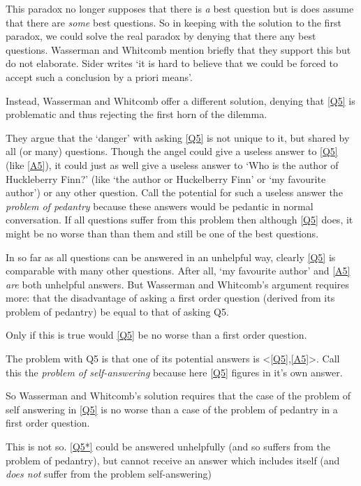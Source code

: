 This paradox no longer supposes that there is \emph{a} best question but is does assume that there are \emph{some} best questions.
So in keeping with the solution to the first paradox, we could solve the real paradox by denying that there any best questions.
Wasserman and Whitcomb mention briefly that they support this but do not elaborate. 
\autocite[151]{Wasserman_2011}
Sider writes `it is hard to believe that we could be forced to accept such a conclusion by a priori means'.
\autocite[4]{Sider1997}

Instead, Wasserman and Whitcomb offer a different solution, denying that \ref{Q5} is problematic and thus rejecting the first horn of the dilemma.

They argue that the `danger' with asking \ref{Q5} is not unique to it, but shared by all (or many) questions. 
Though the angel could give a useless answer to \ref{Q5} (like \ref{A5}), it could just as well give a useless answer to `Who is the author of Huckleberry Finn?' (like `the author or Huckelberry Finn' or `my favourite author') or any other question.
Call the potential for such a useless answer the \textit{problem of pedantry} because these answers would be pedantic in normal conversation.
If all questions suffer from this problem then although \ref{Q5} does, it might be no worse than than them and still be one of the best questions.

In so far as all questions can be answered in an unhelpful way, clearly \ref{Q5} is comparable with many other questions.
After all, `my favourite author' and \ref{A5} \emph{are} both unhelpful answers.
But Wasserman and Whitcomb's argument requires more: that the disadvantage of asking a first order question (derived from its problem of pedantry) be equal to that of asking Q5.

Only if this is true would \ref{Q5} be no worse than a first order question.

The problem with Q5 is that one of its potential answers is <\ref{Q5},\ref{A5}>.
Call this the \textit{problem of self-answering} because here \ref{Q5} figures in it's own answer.

So Wasserman and Whitcomb's solution requires that the case of the problem of self answering in \ref{Q5} is no worse than a case of the problem of pedantry in a first order question.

This is not so.
\ref{Q5*} could be answered unhelpfully (and so suffers from the problem of pedantry), but cannot receive an answer which includes itself (and \emph{does not} suffer from the problem self-answering)

